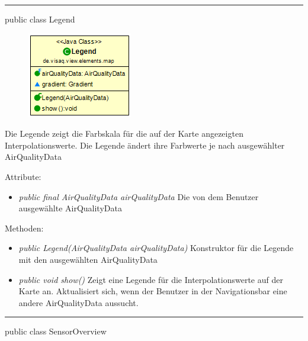 

\rule{\textwidth}{0.4pt}
public class Legend

\begin{minipage}{0.3\textwidth}
    \begin{figure}[H]
        \includegraphics[scale = 0.6]{media/frontend/view/de.view.elements.map/Legend_Class.png}
    \end{figure}
    \end{minipage} \hfill
    \begin{minipage}{0.6\textwidth}
Die Legende zeigt die Farbskala für die auf der Karte angezeigten Interpolationswerte. Die Legende ändert ihre Farbwerte je nach ausgewählter AirQualityData
\end{minipage}

Attribute:
\begin{itemize}
    \item \emph{public final AirQualityData airQualityData} Die von dem Benutzer ausgewählte AirQualityData
\end{itemize}
Methoden:
\begin{itemize}
    \item \emph{public Legend(AirQualityData airQualityData)} Konstruktor für die Legende mit den ausgewählten AirQualityData
    \item \emph{public void show()} Zeigt eine Legende für die Interpolationswerte auf der Karte an. Aktualisiert sich, wenn der Benutzer in der Navigationsbar eine andere AirQualityData aussucht.
\end{itemize}

\rule{\textwidth}{0.4pt}
public class SensorOverview

